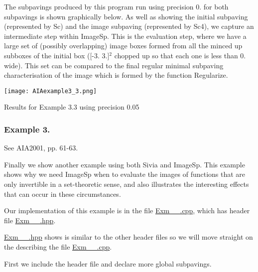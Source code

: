 \begin{DoxyCodeInclude}
  delete A;         // Delete all subpavings newed in dynamic memory
  delete Sc;
  delete Sc4;

  return 0;
}

\end{DoxyCodeInclude}


\-The subpavings produced by this program run using precision 0. for both subpavings is shown graphically below. \-As well as showing the initial subpaving (represented by \-Sc) and the image subpaving (represented by \-Sc4), we capture an intermediate step within \-Image\-Sp. \-This is the evaluation step, where we have a large set of (possibly overlapping) image boxes formed from all the minced up subboxes of the initial box (\mbox{[}-\/3. 3.\mbox{]}$^{\mbox{2}}$  chopped up so that each one is less than 0. wide). \-This set can be compared to the final regular minimal subpaving characterisation of the image which is formed by the function \-Regularize.

 
\begin{DoxyImage}
\texttt{[image: AIAexample3\_3.png]}
\caption{\-Results for \-Example 3.3 using precision 0.05}
\end{DoxyImage}
\hypertarget{AIASubPavings_AIAexamsec_3_4}{}\subsubsection{\-Example 3.}\label{AIASubPavings_AIAexamsec_3_4}
\-See \-A\-I\-A2001, pp. 61-\/63.

\label{AIASubPavings_AIAexample3_4}%
\hypertarget{AIASubPavings_AIAexample3_4}{}%
\-Finally we show another example using both \-Sivia and \-Image\-Sp. \-This example shows why we need \-Image\-Sp when to evaluate the images of functions that are only invertible in a set-\/theoretic sense, and also illustrates the interesting effects that can occur in these circumstances.

\-Our implementation of this example is in the file \hyperlink{Exm__3__4_8cpp}{\-Exm\-\_\-\_.\-cpp}, which has header file \hyperlink{Exm__3__4_8hpp}{\-Exm\-\_\-\_.\-hpp}.

\hyperlink{Exm__3__4_8hpp}{\-Exm\-\_\-\_.\-hpp} shows is similar to the other header files so we will move straight on the describing the file \hyperlink{Exm__3__4_8cpp}{\-Exm\-\_\-\_.\-cpp}.



\-First we include the header file and declare more global subpavings.


